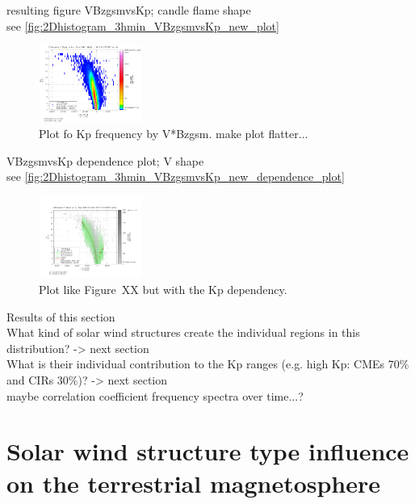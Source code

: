 resulting figure VBzgsmvsKp; candle flame shape\\
see \autoref{fig:2Dhistogram_3hmin_VBzgsmvsKp_new_plot}
\begin{figure}[htb]
	\centering
	\includegraphics[width=0.3\textwidth]{images/gnuplots/2Dhistogram_3hmin_VBzgsmvsKp_new_plot.png}
	\caption{Plot fo Kp frequency by V*Bzgsm. make plot flatter...}
	\label{fig:2Dhistogram_3hmin_VBzgsmvsKp_new_plot}
\end{figure}

VBzgsmvsKp dependence plot; V shape\\
see \autoref{fig:2Dhistogram_3hmin_VBzgsmvsKp_new_dependence_plot}
\begin{figure}[htb]
	\centering
	\includegraphics[width=0.3\textwidth]{images/gnuplots/2Dhistogram_3hmin_VBzgsmvsKp_new_dependence_plot.png}
	\caption{Plot like Figure~XX but with the Kp dependency.}
	\label{fig:2Dhistogram_3hmin_VBzgsmvsKp_new_dependence_plot}
\end{figure}

Results of this section\\
What kind of solar wind structures create the individual regions in this distribution? -> next section\\
What is their individual contribution to the Kp ranges (e.g. high Kp: CMEs 70\% and CIRs 30\%)? -> next section\\

maybe correlation coefficient frequency spectra over time...?\\


\section{Solar wind structure type influence on the terrestrial magnetosphere}


